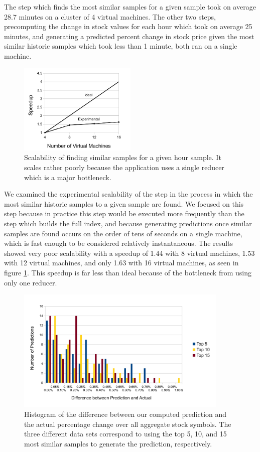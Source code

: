 \documentclass[twocolumn]{article}
\begin{document}
The step which finds the most similar samples for a given sample took on average 28.7 minutes on a cluster of 4 virtual machines. The other two steps, precomputing the change in stock values for each hour which took on average 25 minutes, and generating a predicted percent change in stock price given the most similar historic samples which took less than 1 minute, both ran on a single machine.

\begin{figure}
\centering
\includegraphics[width=0.5\textwidth]{speedup}
\caption{Scalability of finding similar samples for a given hour sample. It scales rather poorly because the application uses a single reducer which is a major bottleneck.}
\label{speedup}
\end{figure}

We examined the experimental scalability of the step in the process in which the most similar historic samples to a given sample are found. We focused on this step because in practice this step would be executed more frequently than the step which builds the full index, and because generating predictions once similar samples are found occurs on the order of tens of seconds on a single machine, which is fast enough to be considered relatively instantaneous. The results showed very poor scalability with a speedup of 1.44 with 8 virtual machines, 1.53 with 12 virtual machines, and only 1.63 with 16 virtual machines, as seen in figure \ref{speedup}. This speedup is far less than ideal because of the bottleneck from using only one reducer.

\begin{figure}
\centering
\includegraphics[width=0.9\textwidth]{histogram}
\caption{Histogram of the difference between our computed prediction and the actual percentage change over all aggregate stock symbols. The three different data sets correspond to using the top 5, 10, and 15 most similar samples to generate the prediction, respectively.}
\label{histogram}
\end{figure}
\end{document}
